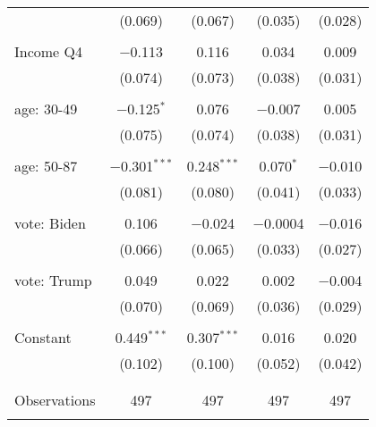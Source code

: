 \begin{tabular}{@{\extracolsep{5pt}}lcccc}
  & (0.069) & (0.067) & (0.035) & (0.028) \\ 
  & & & & \\ 
 Income Q4 & $-$0.113 & 0.116 & 0.034 & 0.009 \\ 
  & (0.074) & (0.073) & (0.038) & (0.031) \\ 
  & & & & \\ 
 age: 30-49 & $-$0.125$^{*}$ & 0.076 & $-$0.007 & 0.005 \\ 
  & (0.075) & (0.074) & (0.038) & (0.031) \\ 
  & & & & \\ 
 age: 50-87 & $-$0.301$^{***}$ & 0.248$^{***}$ & 0.070$^{*}$ & $-$0.010 \\ 
  & (0.081) & (0.080) & (0.041) & (0.033) \\ 
  & & & & \\ 
 vote: Biden & 0.106 & $-$0.024 & $-$0.0004 & $-$0.016 \\ 
  & (0.066) & (0.065) & (0.033) & (0.027) \\ 
  & & & & \\ 
 vote: Trump & 0.049 & 0.022 & 0.002 & $-$0.004 \\ 
  & (0.070) & (0.069) & (0.036) & (0.029) \\ 
  & & & & \\ 
 Constant & 0.449$^{***}$ & 0.307$^{***}$ & 0.016 & 0.020 \\ 
  & (0.102) & (0.100) & (0.052) & (0.042) \\ 
  & & & & \\ 
\hline \\[-1.8ex] 

Observations & 497 & 497 & 497 & 497 \\ 
\hline 
\hline \\[-1.8ex] 
\end{tabular} 